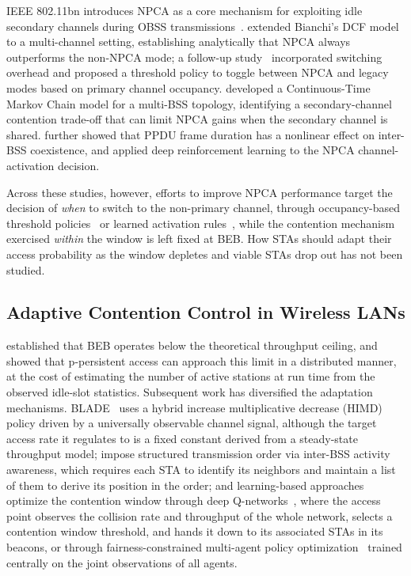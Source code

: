 \documentclass[a4paper,fleqn]{cas-dc}
\begin{document}
IEEE 802.11bn introduces NPCA as a core mechanism for exploiting idle
secondary channels during OBSS transmissions~\citep{ieee80211bn,galati2024will}.
\citet{wei2024non} extended Bianchi's DCF model to a
multi-channel setting, establishing analytically that NPCA always outperforms
the non-NPCA mode; a follow-up study~\citep{wei2024optimized} incorporated
switching overhead and proposed a threshold policy to toggle between NPCA
and legacy modes based on primary channel occupancy. \citet{bellalta2025performance} developed a Continuous-Time
Markov Chain model for a multi-BSS topology, identifying a secondary-channel
contention trade-off that can limit NPCA gains when the secondary channel
is shared. \citet{lee2024impact} further showed that PPDU frame
duration has a nonlinear effect on inter-BSS coexistence, and \citet{song2026adaptive}
applied deep reinforcement learning to the NPCA channel-activation decision.

Across these studies, however, efforts to improve NPCA performance target
the decision of \emph{when} to switch to the non-primary channel, through
occupancy-based threshold policies~\citep{wei2024optimized} or learned
activation rules~\citep{song2026adaptive}, while the contention mechanism
exercised \emph{within} the window is left fixed at BEB. How STAs should
adapt their access probability as the window depletes and viable STAs
drop out has not been studied.

\subsection{Adaptive Contention Control in Wireless LANs}

\citet{bianchi2000performance} established that BEB operates below
the theoretical throughput ceiling, and \citet{cali2002dynamic}
showed that p-persistent access can approach this limit in a distributed
manner, at the cost of estimating the number of active stations at run time
from the observed idle-slot statistics. Subsequent work has diversified
the adaptation mechanisms. BLADE~\citep{guo2026blade} uses a hybrid increase
multiplicative decrease (HIMD) policy
driven by a universally observable channel signal, although the target
access rate it regulates to is a fixed constant derived from a steady-state
throughput model; \citet{wilhelmi2025s} impose structured transmission order
via inter-BSS activity awareness, which requires each STA to identify its
neighbors and maintain a list of them to derive its position in the order;
and learning-based approaches
optimize the contention window through deep Q-networks~\citep{zuo2025adaptive},
where the access point observes the collision rate and throughput of the
whole network, selects a contention window threshold, and hands it down to
its associated STAs in its beacons, or through fairness-constrained multi-agent policy
optimization~\citep{pan2025ai} trained centrally on the joint observations of
all agents.
\end{document}
